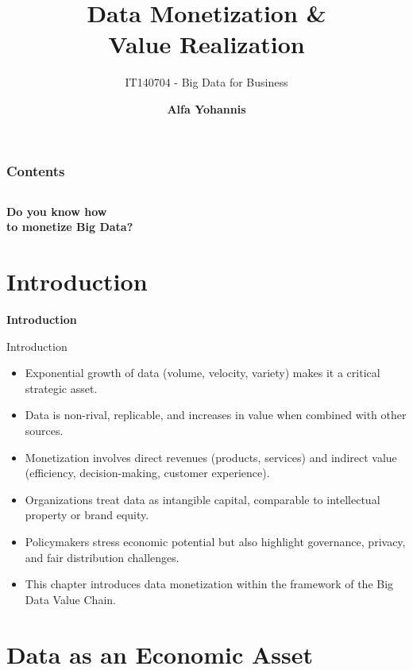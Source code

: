 \documentclass[aspectratio=169, table]{beamer}
\title{\Huge Data Monetization \& \\
	\vspace{10pt}
	Value Realization}
\subtitle{IT140704 - Big Data for Business}
\author{\textbf{Alfa Yohannis}}
\begin{document}
	
	\frame{\titlepage}
	
	
	\begin{frame}[fragile]
		\frametitle{Contents}
		\vspace{20pt}
		\begin{columns}[t]
			\tableofcontents[sections={1-5}]
			
			\tableofcontents[sections={6-20}]
		\end{columns}
	\end{frame}
	
	\begin{frame}{\hfill}
		\centering
		\Huge{\textbf{Do you know how\\to monetize Big Data?}}
	\end{frame}
	
	\section{Introduction}
	
	\begin{frame}{\hfill}
		\centering
		\Huge{\textbf{Introduction}}
	\end{frame}
	
	\begin{frame}{Introduction}
		\vspace{20pt}
		\begin{itemize}
			\item Exponential growth of data (volume, velocity, variety) makes it a critical strategic asset.  
			\item Data is non-rival, replicable, and increases in value when combined with other sources.  
			\item Monetization involves direct revenues (products, services) and indirect value (efficiency, decision-making, customer experience).  
			\item Organizations treat data as intangible capital, comparable to intellectual property or brand equity.  
			\item Policymakers stress economic potential but also highlight governance, privacy, and fair distribution challenges.  
			\item This chapter introduces data monetization within the framework of the Big Data Value Chain.  
		\end{itemize}
	\end{frame}
	
	\section{Data as an Economic Asset}
	
\end{document}
